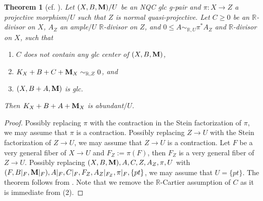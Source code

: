 \documentclass[11pt]{amsart}
\numberwithin{equation}{section}
\newcommand{\Mm}{{\bf{M}}}
\newcommand{\Rr}{\mathbb{R}}
\newtheorem{thm}{Theorem}[section]
\theoremstyle{definition}
\theoremstyle{definition}
\theoremstyle{definition}
\begin{document}
\begin{thm}[{cf. \cite[Theorem 3.5]{Has20b}}]\label{thm: has20b 3.5 rel ver}
Let $(X,B,\Mm)/U$ be an NQC glc g-pair and $\pi: X\rightarrow Z$ a projective morphism$/U$ such that $Z$ is normal quasi-projective. Let $C\geq 0$ be an $\Rr$-divisor on $X$, $A_Z$ an ample$/U$ $\Rr$-divisor on $Z$, and $0\leq A\sim_{\Rr,U}\pi^*A_Z$ and $\Rr$-divisor on $X$, such that
\begin{enumerate}
    \item $C$ does not contain any glc center of $(X,B,\Mm)$,
    \item $K_X+B+C+\Mm_X\sim_{\Rr,Z}0$, and
    \item $(X,B+A,\Mm)$ is glc.
\end{enumerate}
Then $K_X+B+A+\Mm_X$ is abundant$/U$.
\end{thm}
\begin{proof}
Possibly replacing $\pi$ with the contraction in the Stein factorization of $\pi$, we may assume that $\pi$ is a contraction. Possibly replacing $Z\rightarrow U$ with the Stein factorization of $Z\rightarrow U$, we may assume that $Z\rightarrow U$ is a contraction. Let $F$ be a very general fiber of $X\rightarrow U$ and $F_Z:=\pi(F)$, then $F_Z$ is a very general fiber of $Z\rightarrow U$. Possibly replacing $(X,B,\Mm),A,C,Z,A_Z,\pi,U$ with $(F,B|_F,\Mm|_F),A|_F,C|_F,F_Z,A_Z|_{F_Z},\pi|_F,\{pt\}$, we may assume that $U=\{pt\}$. The theorem follows from \cite[Theorem 3.5]{Has20b}.  Note that we remove the $\Rr$-Cartier assumption of $C$ as it is immediate from (2).
 \end{proof}
 
\end{document}
